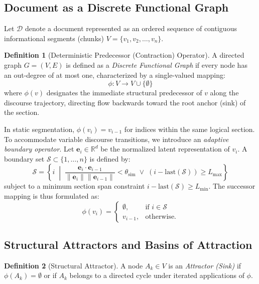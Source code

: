 \documentclass[10pt,twocolumn]{article}
\theoremstyle{definition}
\newtheorem{definition}{Definition}
\begin{document}
\subsection{Document as a Discrete Functional Graph}

Let $\mathcal{D}$ denote a document represented as an ordered sequence of contiguous informational segments (chunks) $V = \{v_1, v_2, \dots, v_n\}$.

\begin{definition}[Deterministic Predecessor (Contraction) Operator]
A directed graph $G = (V, E)$ is defined as a \textit{Discrete Functional Graph} if every node has an out-degree of at most one, characterized by a single-valued mapping:
\begin{equation}
\phi: V \to V \cup \{\emptyset\}
\end{equation}
where $\phi(v)$ designates the immediate structural predecessor of $v$ along the discourse trajectory, directing flow backwards toward the root anchor (sink) of the section.
\end{definition}

In static segmentation, $\phi(v_i) = v_{i-1}$ for indices within the same logical section. To accommodate variable discourse transitions, we introduce an \textit{adaptive boundary operator}. Let $\mathbf{e}_i \in \mathbb{R}^d$ be the normalized latent representation of $v_i$. A boundary set $\mathcal{S} \subset \{1, \dots, n\}$ is defined by:
\begin{equation}
\mathcal{S} = \left\{ i \;\middle|\; \frac{\mathbf{e}_i \cdot \mathbf{e}_{i-1}}{\|\mathbf{e}_i\| \|\mathbf{e}_{i-1}\|} < \theta_{\text{sim}} \;\lor\; (i - \text{last}(\mathcal{S})) \ge L_{\max} \right\}
\end{equation}
subject to a minimum section span constraint $i - \text{last}(\mathcal{S}) \ge L_{\min}$. The successor mapping is thus formulated as:
\begin{equation}
\phi(v_i) = \begin{cases}
\emptyset, & \text{if } i \in \mathcal{S} \\
v_{i-1}, & \text{otherwise.}
\end{cases}
\end{equation}

\subsection{Structural Attractors and Basins of Attraction}

\begin{definition}[Structural Attractor]
A node $A_k \in V$ is an \textit{Attractor (Sink)} if $\phi(A_k) = \emptyset$ or if $A_k$ belongs to a directed cycle under iterated applications of $\phi$.
\end{definition}
\end{document}
